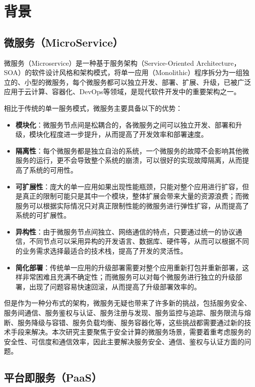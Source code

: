 \section{背景}\label{sec:background}

\subsection{微服务（MicroService）}
微服务（Microservice）是一种基于服务架构（Service-Oriented Architecture，SOA）的软件设计风格和架构模式，将单一应用（Monolithic）程序拆分为一组独立的、小型的微服务，每个微服务都可以独立开发、部署、扩展、升级，已被广泛应用于云计算、容器化、DevOps等领域，是现代软件开发中的重要架构之一。

相比于传统的单一服务模式，微服务主要具备以下的优势：

\begin{itemize}
    \item \textbf{模块化}：微服务节点间是松耦合的，各微服务之间可以独立开发、部署和升级，模块化程度进一步提升，从而提高了开发效率和部署速度。
    \item \textbf{隔离性}：每个微服务都是独立自治的系统，一个微服务的故障不会影响其他微服务的运行，更不会导致整个系统的崩溃，可以很好的实现故障隔离，从而提高了系统的可用性。
    \item \textbf{可扩展性}：庞大的单一应用如果出现性能瓶颈，只能对整个应用进行扩容，但是真正的限制可能只是其中一个模块，整体扩展会带来大量的资源浪费；而微服务可以根据实际情况只对真正限制性能的微服务进行弹性扩容，从而提高了系统的可扩展性。
    \item \textbf{异构性}：由于微服务节点间独立、网络通信的特点，只要通过统一的协议通信，不同节点可以采用异构的开发语言、数据库、硬件等，从而可以根据不同的业务需求选择最适合的技术栈，提高了开发的灵活性。
    \item \textbf{简化部署}：传统单一应用的升级部署需要对整个应用重新打包并重新部署，这样非常困难且充满不确定性；而微服务可以对每个微服务进行独立的升级部署，出现了问题容易快速回滚，从而提高了升级部署效率的。
\end{itemize}

但是作为一种分布式的架构，微服务无疑也带来了许多新的挑战，包括服务安全、服务间通信、服务鉴权与认证、服务注册与发现、服务监控与追踪、服务限流与熔断、服务降级与容错、服务负载均衡、服务容器化等，这些挑战都需要通过新的技术手段来解决。本次研究主要聚焦于安全计算的微服务场景，需要着重考虑服务的安全性、可信度和通信效率，因此主要解决服务安全、通信、鉴权与认证方面的问题。

\subsection{平台即服务（PaaS）}

